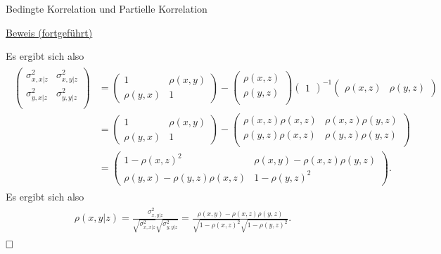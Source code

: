 \documentclass[
  8pt,
  ignorenonframetext,
]{beamer}
\begin{document}
\begin{frame}{Bedingte Korrelation und Partielle Korrelation}
\protect\hypertarget{bedingte-korrelation-und-partielle-korrelation-11}{}
\footnotesize

\underline{Beweis (fortgeführt)}

Es ergibt sich also \begin{align}
\begin{split}
\begin{pmatrix}
\sigma_{x,x|z}^2 & \sigma_{x,y|z}^2 \\
\sigma_{y,x|z}^2 & \sigma_{y,y|z}^2 \\
\end{pmatrix}
& = 
\begin{pmatrix} 
1         & \rho(x,y) \\
\rho(y,x) & 1
\end{pmatrix} - 
\begin{pmatrix}
\rho(x,z) \\
\rho(y,z) \\
\end{pmatrix}
\begin{pmatrix} 
1
\end{pmatrix}^{-1}
\begin{pmatrix}
\rho(x,z) & \rho(y,z)
\end{pmatrix}
\\
& = 
\begin{pmatrix}
1         & \rho(x,y) \\
\rho(y,x) & 1
\end{pmatrix} - 
\begin{pmatrix}
\rho(x,z)\rho(x,z) & \rho(x,z)\rho(y,z) \\
\rho(y,z)\rho(x,z) & \rho(y,z)\rho(y,z)\\
\end{pmatrix}
\\
& = 
\begin{pmatrix} 
1 - \rho(x,z)^2                & \rho(x,y) - \rho(x,z)\rho(y,z)             \\
\rho(y,x) - \rho(y,z)\rho(x,z) & 1 - \rho(y,z)^2
\end{pmatrix}. 
\end{split}
\end{align} Es ergibt sich also \begin{align}
\begin{split}
\rho(x,y|z)
= \frac{\sigma_{x,y|z}^2}{\sqrt{\sigma_{x,x|z}^2}\sqrt{\sigma_{y,y|z}^2}} 
= \frac{\rho(x,y) - \rho(x,z)\rho(y,z)}{\sqrt{1 - \rho(x,z)^2 }\sqrt{1 - \rho(y,z)^2}}.
\end{split}
\end{align} \(\hfill\Box\)
\end{frame}
\end{document}

